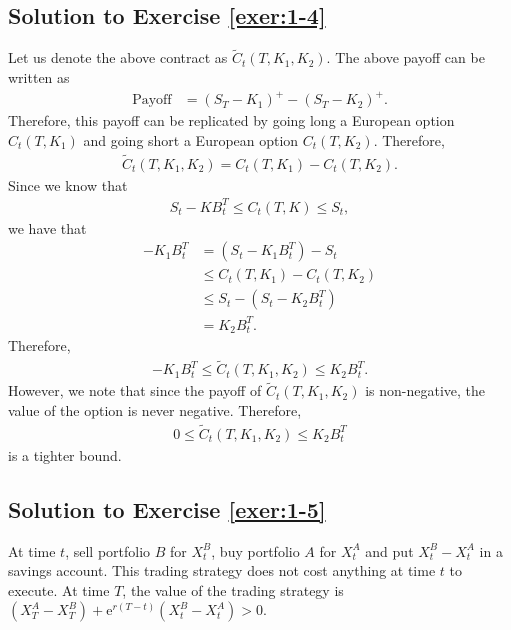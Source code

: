 \documentclass[12pt]{book}
\numberwithin{equation}{chapter}
\theoremstyle{plain}
\numberwithin{theorem}{section}
\theoremstyle{definition}
\numberwithin{exercise}{chapter}
\newcommand{\<}{\langle}
\renewcommand{\>}{\rangle}
\renewcommand{\(}{\left(}
\renewcommand{\)}{\right)}
\renewcommand{\[}{\left[}
\renewcommand{\]}{\right]}
\newcommand\ee{\mathrm{e}}
\theoremstyle{definition}
\numberwithin{question}{section}
\begin{document}
\subsection*{Solution to Exercise \ref{exer:1-4}}
Let us denote the above contract as $\widetilde C_t(T,K_1,K_2)$. The above payoff can be written as
\begin{align}
\text{Payoff}
	&= \( S_T- K_1\)^+ - \( S_T - K_2\)^+.
\end{align}
Therefore, this payoff can be replicated by going long a European option $C_t(T,K_1)$ and going short a European option $C_t(T,K_2)$. Therefore,
\begin{align}
\widetilde C_t(T,K_1,K_2)
	= C_t(T,K_1) - C_t(T,K_2).
\end{align}
Since we know that 
\begin{align}
S_t - K B_t^T 
	\leq C_t(T,K)
	\leq S_t,
\end{align}
we have that 
\begin{align}
-K_1 B_t^T
	&= \( S_t - K_1 B_t^T\) - S_t \\
	&\leq C_t(T,K_1) - C_t(T,K_2) \\
	&\leq S_t - \( S_t - K_2 B_t^T\) \\
	&= K_2 B_t^T.
\end{align}
Therefore,
\begin{align}
-K_1 B_t^T
	\leq \widetilde C_t(T,K_1,K_2)
	\leq K_2 B_t^T.
\end{align}
However, we note that since the payoff of $\widetilde C_t(T,K_1,K_2)$ is non-negative, the value of the option is never negative. Therefore, 
\begin{align}
0
	\leq \widetilde C_t(T,K_1,K_2)
	\leq K_2 B_t^T
\end{align}
is a tighter bound.


\subsection*{Solution to Exercise \ref{exer:1-5}}
At time $t$, sell portfolio $B$ for $X_t^B$, buy portfolio $A$ for $X_t^A$ and put $X_t^B - X_t^A$ in a savings account.  This trading strategy does not cost anything at time $t$ to execute.  At time $T$, the value of the trading strategy is $(X_T^A - X_T^B) + \ee^{r(T-t)} (X_t^B - X_t^A) > 0$.

\end{document}
